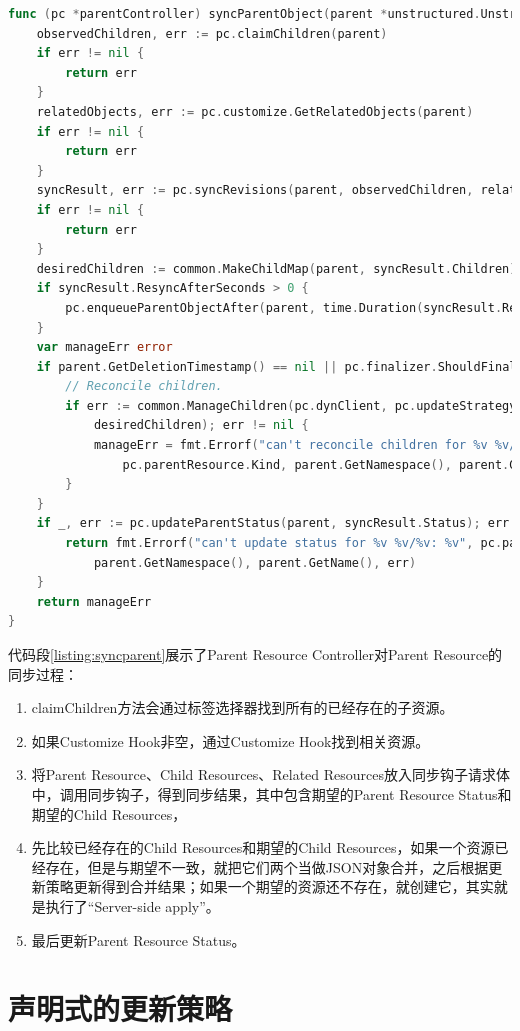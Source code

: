 \documentclass[macfonts,master]{njuthesis}
\begin{document}
\newpage

\begin{lstlisting}[language=Go,caption=同步父资源,label=listing:syncparent]
func (pc *parentController) syncParentObject(parent *unstructured.Unstructured) error {
	observedChildren, err := pc.claimChildren(parent)
	if err != nil {
		return err
	}
	relatedObjects, err := pc.customize.GetRelatedObjects(parent)
	if err != nil {
		return err
	}
	syncResult, err := pc.syncRevisions(parent, observedChildren, relatedObjects)
	if err != nil {
		return err
	}
	desiredChildren := common.MakeChildMap(parent, syncResult.Children)
	if syncResult.ResyncAfterSeconds > 0 {
		pc.enqueueParentObjectAfter(parent, time.Duration(syncResult.ResyncAfterSeconds*float64(time.Second)))
	}
	var manageErr error
	if parent.GetDeletionTimestamp() == nil || pc.finalizer.ShouldFinalize(parent) {
		// Reconcile children.
		if err := common.ManageChildren(pc.dynClient, pc.updateStrategy, parent, observedChildren,
			desiredChildren); err != nil {
			manageErr = fmt.Errorf("can't reconcile children for %v %v/%v: %v",
				pc.parentResource.Kind, parent.GetNamespace(), parent.GetName(), err)
		}
	}
	if _, err := pc.updateParentStatus(parent, syncResult.Status); err != nil {
		return fmt.Errorf("can't update status for %v %v/%v: %v", pc.parentResource.Kind,
			parent.GetNamespace(), parent.GetName(), err)
	}
	return manageErr
}
\end{lstlisting}

代码段\ref{listing:syncparent}展示了Parent Resource Controller对Parent Resource的同步过程：
\begin{enumerate}
	\item claimChildren方法会通过标签选择器找到所有的已经存在的子资源。
	\item 如果Customize Hook非空，通过Customize Hook找到相关资源。
	\item 将Parent Resource、Child Resources、Related Resources放入同步钩子请求体中，调用同步钩子，得到同步结果，其中包含期望的Parent Resource Status和期望的Child Resources，
	\item 先比较已经存在的Child Resources和期望的Child Resources，如果一个资源已经存在，但是与期望不一致，就把它们两个当做JSON对象合并，之后根据更新策略更新得到合并结果；如果一个期望的资源还不存在，就创建它，其实就是执行了``Server-side apply''。
	\item 最后更新Parent Resource Status。
\end{enumerate}

\section{声明式的更新策略}
\end{document}

